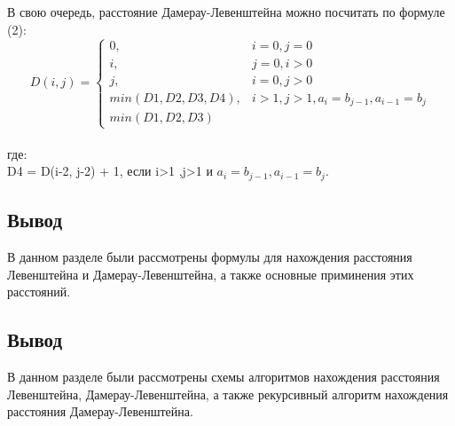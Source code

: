 \documentclass[a4paper, 14pt]{article}
\begin{document}
\begin{center}
\begin{flushleft}
		В свою очередь, расстояние Дамерау-Левенштейна можно посчитать по формуле (2):
		\begin{equation}
			D(i,j) = \left\{ \begin{array}{ll}
			0, & \textrm{$i = 0, j = 0$}\\
			i, & \textrm{$j = 0, i > 0$}\\
 			j, & \textrm{$i = 0, j > 0$}\\
			min(D1,D2,D3,D4), & i>1 , j>1, a_{i} = b_{j-1},a_{i-1}=b_{j}  \\
			min(D1,D2,D3)
  			\end{array} \right.
		\end{equation}
		\\где:\\
		D4 = D(i-2, j-2) + 1, если i>1 ,j>1 и $a_{i} = b_{j-1},a_{i-1}=b_{j} $.\\
		\end{flushleft}
    \end{center}
    \begin{center}
    \subsection{Вывод}
    \end{center}

    В данном разделе были рассмотрены формулы для нахождения расстояния Левенштейна и Дамерау-Левенштейна, а также основные приминения этих расстояний.\\

    \begin{center}
    	\newpage

		\newpage
    \end{center}
    
    
    
\subsection{Вывод}
 	
    \begin{flushleft}	
	В данном разделе были рассмотрены схемы алгоритмов нахождения расстояния Левенштейна, Дамерау-Левенштейна, а также рекурсивный алгоритм нахождения расстояния Дамерау-Левенштейна.
    \end{flushleft}
\end{document}
